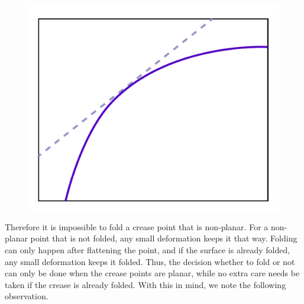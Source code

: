 \begin{figure}
  \centering
  \includegraphics[width=\linewidth]{figures/ruling_tangent_to_a_curved_fold}
\end{figure}

Therefore it is impossible to fold a crease point that is non-planar. For a non-planar point that is not folded, any small deformation keeps it that way. Folding can only happen after flattening the point, and if the surface is already folded, any small deformation keeps it folded. Thus, the decision whether to fold or not can only be done when the crease points are planar, while no extra care needs be taken if the crease is already folded. With this in mind, we note the following observation.

